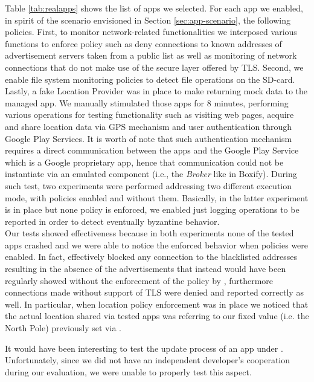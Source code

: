Table \ref{tab:realapps} shows the list of apps we selected. For each app we enabled, in spirit of the scenario envisioned in Section \ref{sec:app-scenario}, the following policies. First, to monitor network-related functionalities we interposed various functions to enforce policy such as deny connections to known addresses of advertisement servers taken from a public list\cite{adware} as well as monitoring of network connections that do not make use of the secure layer offered by TLS. Second, we enable file system monitoring policies to detect file operations on the SD-card. Lastly, a fake Location Provider was in place to make \asd returning mock data to the managed app. We manually stimulated those apps for 8 minutes, performing various operations for testing functionality such as visiting web pages, acquire and share location data via GPS mechanism and user authentication through Google Play Services. It is worth of note that such authentication mechanism requires a direct communication between the apps and the Google Play Service which is a Google proprietary app, hence that communication could not be instantiate via an emulated component (i.e., the \textit{Broker} like in Boxify). 
During such test, two experiments were performed addressing two different execution mode,  \asd with policies enabled and without them. Basically, in the latter experiment \asd  is in place but none policy is enforced, we enabled just logging operations to be reported in order to detect eventually byzantine behavior. \\
Our tests  showed \asd effectiveness because in both experiments none of the tested apps crashed and we were able to notice the enforced behavior when policies were enabled. In fact, \asd effectively blocked any connection to the blacklisted addresses resulting in  the absence of the advertisements that instead would have been regularly showed without the enforcement of the policy by \asd, furthermore connections made without support of TLS were denied and reported correctly as well. In particular, when location policy enforcement was in place we noticed that the actual location shared via tested apps was referring to our fixed value (i.e. the North Pole) previously set via \asd. 

It would have been interesting to test the update process of an app under \asd. Unfortunately, since we did not have an independent developer's cooperation during our evaluation, we were unable to properly test this aspect. \\

